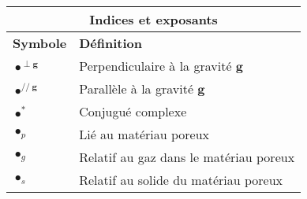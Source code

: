 \bigskip

\begin{center}
	\begin{tabular}{ll}
		\multicolumn{2}{c}{Indices et exposants}  \\\hline
		\textbf{Symbole} & \textbf{Définition} \\\hline\hline
		$\bullet^{\perp \mathbf g}$ & Perpendiculaire à la gravité $\mathbf g$ \\
		$\bullet^{//~\mathbf g}$ & Parallèle à la gravité $\mathbf g$ \\
		$\bullet^*$ & Conjugué complexe\\
		$\bullet_p$ & Lié au matériau poreux\\		
		$\bullet_g$ & Relatif au gaz dans le matériau poreux\\
		$\bullet_s$ & Relatif au solide du matériau poreux
	\end{tabular}
\end{center}